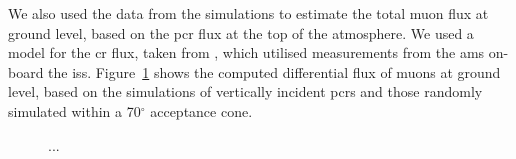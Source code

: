 We also used the data from the simulations to estimate the total muon flux at ground level, based on the \gls{pcr} flux at the top of the atmosphere. We used a model for the \gls{cr} flux, taken from \citet{corti_numerical_2019}, which utilised measurements from the \gls{ams} on-board the \gls{iss}. Figure~\ref{fig:CORSIKA_muon_spectra} shows the computed differential flux of muons at ground level, based on the simulations of vertically incident \glspl{pcr} and those randomly simulated within a 70$^\circ$ acceptance cone.


\begin{figure}[ht!]
	\centering
	\qquad
	\caption{...}
	\label{fig:CORSIKA_muon_spectra}
\end{figure}



